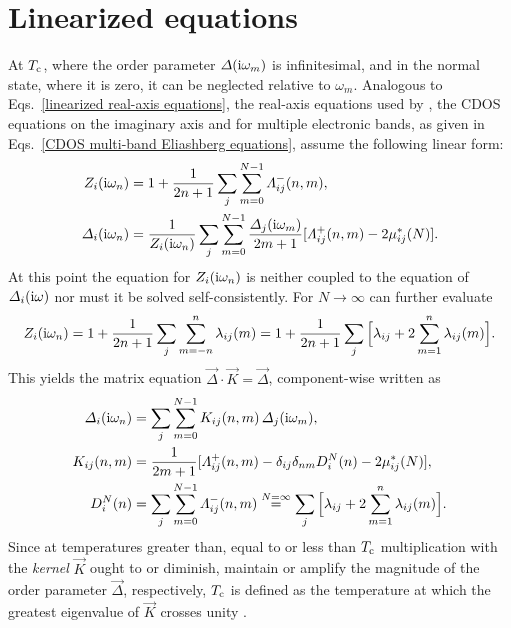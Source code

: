 \section{Linearized equations}

At $T \sb{\text{c}}$, where the order parameter $\varDelta(\mathrm i \omega_m)$ is infinitesimal,
and in the normal state, where it is zero, it can be neglected relative to
$\omega_m$. Analogous to Eqs.~\ref{linearized real-axis equations}, the
real-axis equations used by , the CDOS 
equations on the imaginary axis and for multiple electronic bands, as given in
Eqs.~\ref{CDOS multi-band Eliashberg equations}, assume the following linear
form:
%
\begin{subequations} \label{linearized CDOS multi-band Eliashberg equations}
    \begin{align}
        Z_i(\mathrm i \omega_n)
        &= 1 + \frac 1 {2 n + 1} \sum_j \sum_{m = 0}^{N - 1}
        \varLambda_{i j}^-(n, m),
        \\
        \varDelta_i(\mathrm i \omega_n) &= \frac 1 {Z_i(\mathrm i \omega_n)}
        \sum_j \sum_{m = 0}^{N - 1}
        \frac{\varDelta_j(\mathrm i \omega_m)}{2 m + 1}
        [\varLambda_{i j}^+(n, m) - 2 \mu^*_{i j}(N)].
    \end{align}
\end{subequations}
%
At this point the equation for $Z_i(\mathrm i \omega_n)$ is neither coupled to the
equation of $\varDelta_i(\mathrm i \omega)$ nor must it be solved self-consistently. For
$N \rightarrow \infty$ can further evaluate
%
\begin{equation} \label{normal-state renormalization}
    Z_i(\mathrm i \omega_n) = 1 + \frac 1 {2 n + 1} \sum_j \sum_{m = -n}^n
    \lambda_{i j}(m)
    = 1 + \frac 1 {2 n + 1} \sum_j
    \Big[ \lambda_{i j} + 2 \sum_{m = 1}^n \lambda_{i j}(m) \Big].
\end{equation}
%
This yields the matrix equation $\vec \Delta \cdot \vec K = \vec \Delta$,
component-wise written as
%
\begin{equation} \label{CDOS linearized gap equation}
    \begin{split}
        \varDelta_i(\mathrm i \omega_n) &= \sum_j \sum_{m = 0}^{N - 1}
        K_{i j}(n, m) \, \varDelta_j(\mathrm i \omega_m),
        \\
        K_{i j}(n, m) &= \frac 1 {2 m + 1} [\varLambda_{i j}^+(n, m)
        - \delta_{i j} \delta_{n m} D_i^N(n) - 2 \mu^*_{i j}(N)],
        \\
        D_i^N(n) &= \sum_j \sum_{m = 0}^{N - 1} \varLambda_{i j}^-(n, m)
        \overset{N = \infty} =
        \sum_j \Big[ \lambda_{i j} + 2 \sum_{m = 1}^n \lambda_{i j}(m) \Big].
    \end{split}
\end{equation}
%
Since at temperatures greater than, equal to or less than $T \sb{\text{c}}$
multiplication with the \emph{kernel} $\vec K$ ought to or diminish, maintain or
amplify the magnitude of the order parameter $\vec \Delta$, respectively, $T
\sb{\text{c}}$ is defined as the temperature at which the greatest eigenvalue of $\vec
K$ crosses unity \cite[47]{AllenMitrovic82}.

